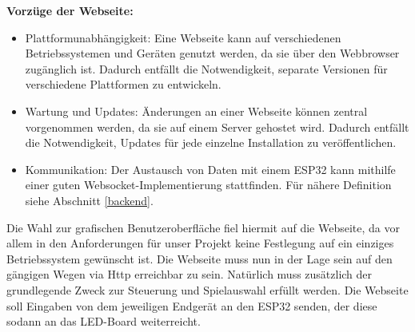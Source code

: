 \documentclass[12pt,a4paper]{article}
\begin{document}
\newpage

\textbf{Vorzüge der Webseite:}\\
\begin{itemize}
\item Plattformunabhängigkeit: Eine Webseite kann auf verschiedenen Betriebssystemen und Geräten  genutzt werden, da sie über den Webbrowser zugänglich ist. Dadurch entfällt die Notwendigkeit, separate Versionen für verschiedene Plattformen zu entwickeln.
\item Wartung und Updates: Änderungen an einer Webseite können zentral vorgenommen werden, da sie auf einem Server gehostet wird. Dadurch entfällt die Notwendigkeit, Updates für jede einzelne Installation zu veröffentlichen.
\item Kommunikation: Der Austausch von Daten mit einem ESP32 kann mithilfe einer guten Websocket-Implementierung stattfinden. Für nähere Definition siehe Abschnitt \ref{backend}.
\end{itemize}

Die Wahl zur grafischen Benutzeroberfläche fiel hiermit auf die Webseite, da vor allem in den Anforderungen für unser Projekt keine Festlegung auf ein einziges Betriebssystem gewünscht ist. Die Webseite muss nun in der Lage sein auf den gängigen Wegen via Http erreichbar zu sein. Natürlich muss zusätzlich der grundlegende Zweck zur Steuerung und Spielauswahl erfüllt werden. Die Webseite soll Eingaben von dem jeweiligen Endgerät an den ESP32 senden, der diese sodann an das LED-Board weiterreicht. 
\end{document}
